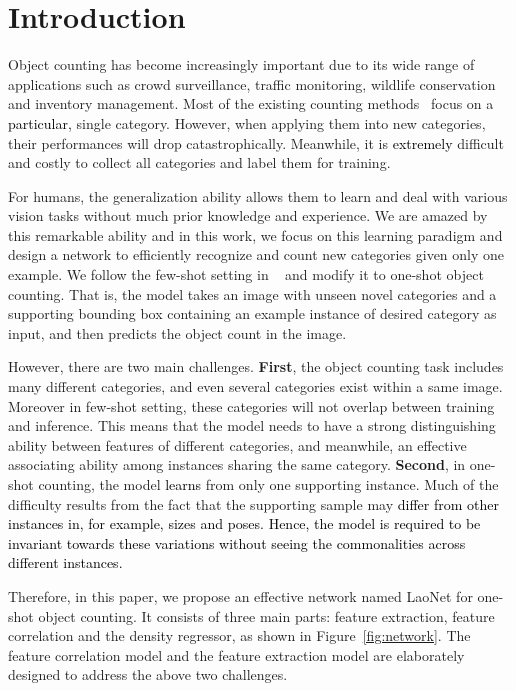 \documentclass{article}
\newcommand\XP[1]{\textcolor{black}{#1}}\newcommand\XPC[1]{\textcolor{black}{[#1]}}
\begin{document}
\section{Introduction}

Object counting has become increasingly important due to its wide range of applications such as crowd surveillance, traffic monitoring, wildlife conservation and inventory management. Most of the existing counting methods~\cite{zhang2016single, ma2019bayesian, biswas2017automatic} focus on a \XP{particular,} single category. However, when applying them into new categories, their performances will drop catastrophically. Meanwhile, it is \XP{extremely} difficult and costly to collect all categories and label them for training. 

For humans, the generalization ability allows them to learn and deal with various vision tasks without much prior knowledge and experience. We are amazed by this remarkable ability and in this work, we focus on this learning paradigm and design a network to efficiently recognize and count new categories given only one example. We follow the few-shot setting in ~\cite{ranjan2021learning} and modify it to one-shot object counting. That is, the model takes an image with unseen novel categories and a supporting bounding box containing an example instance of desired category as input, and then predicts the object count in the image. 

However, there are two main challenges. \textbf{First}, the object counting task includes many different categories, and even several categories exist within a same image. Moreover in few-shot setting, these categories will not overlap between training and inference. This means that the model needs to have a strong distinguishing ability between features of different categories, and meanwhile, an effective associating ability among instances sharing the same category.
\textbf{Second}, in one-shot counting, the model \XP{learns}
from only one supporting instance. Much of the difficulty results from the fact that the supporting sample may \XP{differ from other instances in, for example, sizes and poses. Hence, the model is required to be invariant towards these variations without seeing the commonalities across different instances.}


Therefore, in this paper, we propose an effective network named LaoNet for one-shot object counting. It consists of three main parts: feature extraction, feature correlation and the density regressor, as shown in Figure~\ref{fig:network}. The feature correlation model and the feature extraction model are elaborately designed to address the above two challenges.
\end{document}
